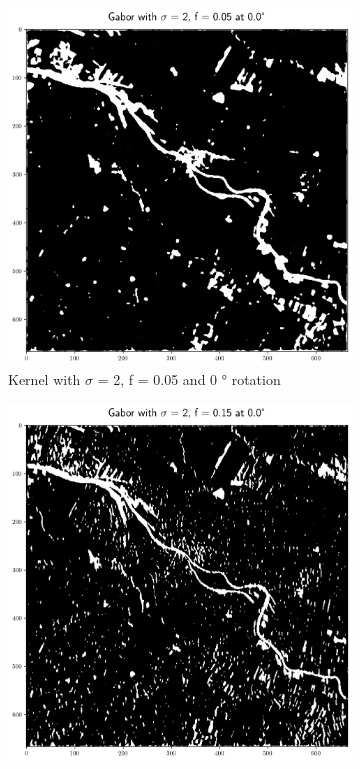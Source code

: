 \documentclass[a4paper, english]{article}
\begin{document}
    \begin{figure}[!htbp]
       \centering
     \begin{subfigure}[b]{0.3\textwidth}
         \centering
         \includegraphics[width=\textwidth]{img/Features_2_005_0.png}
         \caption{Kernel with $\sigma$ = 2, f = 0.05 and 0 ° rotation}\label{fig:feat01}
     \end{subfigure}
     \hfill
     \begin{subfigure}[b]{0.3\textwidth}
         \centering
         \includegraphics[width=\textwidth]{img/Features_2_015_0.png}

\end{subfigure}
\end{figure}
\end{document}
